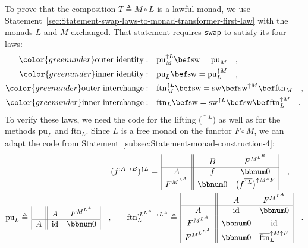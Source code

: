 To prove that the composition $T\triangleq M\circ L$ is a lawful
monad, we use Statement~\ref{sec:Statement-swap-laws-to-monad-transformer-first-law}
with the monads $L$ and $M$ exchanged. That statement requires \lstinline!swap!
to satisfy its four laws:
\begin{align*}
{\color{greenunder}\text{outer identity}:}\quad & \text{pu}_{M}^{\uparrow L}\bef\text{sw}=\text{pu}_{M}\quad,\\
{\color{greenunder}\text{inner identity}:}\quad & \text{pu}_{L}\bef\text{sw}=\text{pu}_{L}^{\uparrow M}\quad,\\
{\color{greenunder}\text{outer interchange}:}\quad & \text{ftn}_{M}^{\uparrow L}\bef\text{sw}=\text{sw}\bef\text{sw}^{\uparrow M}\bef\text{ftn}_{M}\quad,\\
{\color{greenunder}\text{inner interchange}:}\quad & \text{ftn}_{L}\bef\text{sw}=\text{sw}^{\uparrow L}\bef\text{sw}\bef\text{ftn}_{L}^{\uparrow M}\quad.
\end{align*}
To verify these laws, we need the code for the lifting ($^{\uparrow L}$)
as well as for the methods $\text{pu}_{L}$ and $\text{ftn}_{L}$.
Since $L$ is a free monad on the functor $F\circ M$, we can adapt
the code from Statement~\ref{subsec:Statement-monad-construction-4}:
\begin{align*}
 & (f^{:A\rightarrow B})^{\uparrow L}=\,\begin{array}{|c||cc|}
 & B & F^{M^{L^{B}}}\\
\hline A & f & \bbnum 0\\
F^{M^{L^{A}}} & \bbnum 0 & \big(f^{\overline{\uparrow L}}\big)^{\uparrow M\uparrow F}
\end{array}\quad,\\
\text{pu}_{L}\triangleq\,\begin{array}{|c||cc|}
 & A & F^{M^{L^{A}}}\\
\hline A & \text{id} & \bbnum 0
\end{array}\quad, & \quad\quad\text{ftn}_{L}^{:L^{L^{A}}\rightarrow L^{A}}\triangleq\,\begin{array}{|c||cc|}
 & A & F^{M^{L^{A}}}\\
\hline A & \text{id} & \bbnum 0\\
F^{M^{L^{A}}} & \bbnum 0 & \text{id}\\
F^{M^{L^{L^{A}}}} & \bbnum 0 & \overline{\text{ftn}}_{L}^{\uparrow M\uparrow F}
\end{array}\quad.
\end{align*}

